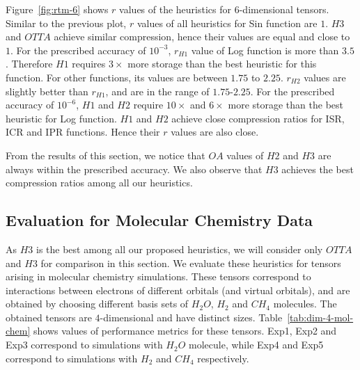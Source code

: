 \documentclass[runningheads]{llncs}
\begin{document}
\noindent Figure~\ref{fig:rtm-6} shows $r$ values of the heuristics for $6$-dimensional tensors. Similar to the previous plot, $r$ values of all heuristics for Sin function are $1$. ${H3}$ and ${OTTA}$ achieve similar compression, hence their values are equal and close to $1$. For the prescribed accuracy of $10^{-3}$, $r_{H1}$ value of Log function is more than $3.5$. Therefore $H1$ requires $3\times$ more storage than the best heuristic for this function. For other functions, its values are between $1.75$ to $2.25$. $r_{H2}$ values are slightly better than $r_{H1}$, and are in the range of $1.75$-$2.25$. For the prescribed accuracy of $10^{-6}$, $H1$ and $H2$ require $10\times$ and $6\times$ more storage than the best heuristic for Log function. $H1$ and $H2$ achieve close compression ratios for ISR, ICR and IPR functions. Hence their $r$ values are also close.

\medskip
\noindent From the results of this section, we notice that $OA$ values of $H2$ and $H3$ are always within the prescribed accuracy. We also observe that $H3$ achieves the best compression ratios among all our heuristics. 

\subsection{Evaluation for Molecular Chemistry Data}
As $H3$ is the best among all our proposed heuristics, we will consider only $OTTA$ and $H3$ for comparison in this section. We evaluate these heuristics for tensors arising in molecular chemistry simulations. These tensors correspond to interactions between electrons of different orbitals (and virtual orbitals), and are obtained by choosing different basis sets of $H_2O$, $H_2$ and $CH_4$ molecules. The obtained tensors are $4$-dimensional and have distinct sizes. Table~\ref{tab:dim-4-mol-chem} shows values of performance metrics for these tensors. Exp1, Exp2 and Exp3 correspond to simulations with $H_2O$ molecule, while Exp4 and Exp5 correspond to simulations with $H_2$ and $CH_4$ respectively. 
 
\end{document}
